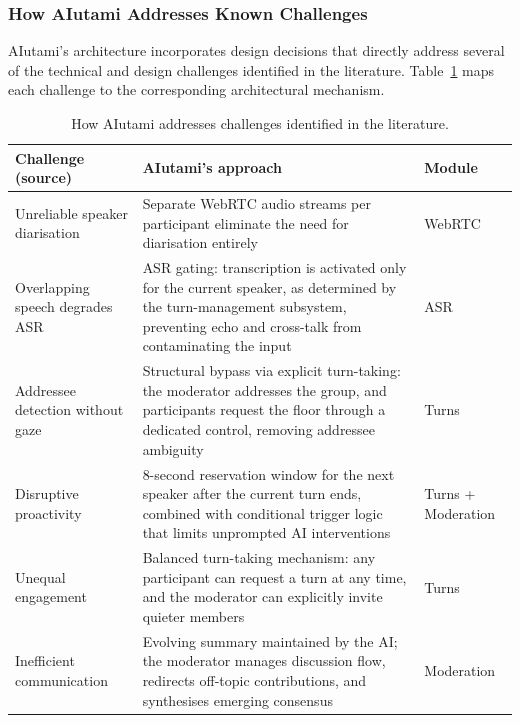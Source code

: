 \subsubsection{How AIutami Addresses Known Challenges}
\label{sssec:aiutami-solutions}

AIutami's architecture incorporates design decisions that directly address
several of the technical and design challenges identified in the literature.
Table~\ref{tab:aiutami-solutions} maps each challenge to the corresponding
architectural mechanism.

\begin{table}[ht]
  \centering
  \caption{How AIutami addresses challenges identified in the literature.}
  \label{tab:aiutami-solutions}
  \small
  \begin{tabularx}{\textwidth}{@{} l X l @{}}
    \toprule
    \textbf{Challenge (source)} & \textbf{AIutami's approach} & \textbf{Module} \\
    \midrule
    Unreliable speaker diarisation \newline\cite{addlesee2020asr}
      & Separate WebRTC audio streams per participant eliminate the need for diarisation entirely
      & WebRTC \\
    \addlinespace
    Overlapping speech degrades ASR \newline\cite{addlesee2020asr}
      & ASR gating: transcription is activated only for the current speaker, as determined by the turn-management subsystem, preventing echo and cross-talk from contaminating the input
      & ASR \\
    \addlinespace
    Addressee detection without gaze \newline\cite{addlesee2024ari}
      & Structural bypass via explicit turn-taking: the moderator addresses the group, and participants request the floor through a dedicated control, removing addressee ambiguity
      & Turns \\
    \addlinespace
    Disruptive proactivity \newline\cite{houde2025koala}
      & 8-second reservation window for the next speaker after the current turn ends, combined with conditional trigger logic that limits unprompted AI interventions
      & Turns + Moderation \\
    \addlinespace
    Unequal engagement \newline\cite{zheng2022polyadic}
      & Balanced turn-taking mechanism: any participant can request a turn at any time, and the moderator can explicitly invite quieter members
      & Turns \\
    \addlinespace
    Inefficient communication \newline\cite{zheng2022polyadic}
      & Evolving summary maintained by the AI; the moderator manages discussion flow, redirects off-topic contributions, and synthesises emerging consensus
      & Moderation \\
    \bottomrule
  \end{tabularx}
\end{table}

